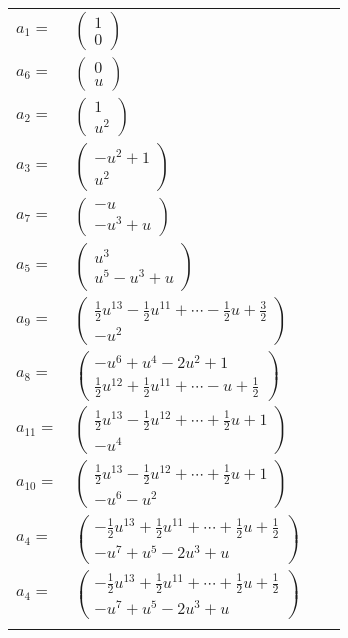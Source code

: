 \documentclass[1p]{elsarticle_modified}
\theoremstyle{definition}
\begin{document}
\begin{tabular}{m{7pt} m{180pt} m{7pt} m{180pt} }
\flushright $a_{1}=$&$\begin{pmatrix}1\\0\end{pmatrix}$ \\
\flushright $a_{6}=$&$\begin{pmatrix}0\\u\end{pmatrix}$ \\
\flushright $a_{2}=$&$\begin{pmatrix}1\\u^2\end{pmatrix}$ \\
\flushright $a_{3}=$&$\begin{pmatrix}- u^2+1\\u^2\end{pmatrix}$ \\
\flushright $a_{7}=$&$\begin{pmatrix}- u\\- u^3+u\end{pmatrix}$ \\
\flushright $a_{5}=$&$\begin{pmatrix}u^3\\u^5- u^3+u\end{pmatrix}$ \\
\flushright $a_{9}=$&$\begin{pmatrix}\frac{1}{2} u^{13}-\frac{1}{2} u^{11}+\cdots-\frac{1}{2} u+\frac{3}{2}\\- u^2\end{pmatrix}$ \\
\flushright $a_{8}=$&$\begin{pmatrix}- u^6+u^4-2 u^2+1\\\frac{1}{2} u^{12}+\frac{1}{2} u^{11}+\cdots- u+\frac{1}{2}\end{pmatrix}$ \\
\flushright $a_{11}=$&$\begin{pmatrix}\frac{1}{2} u^{13}-\frac{1}{2} u^{12}+\cdots+\frac{1}{2} u+1\\- u^4\end{pmatrix}$ \\
\flushright $a_{10}=$&$\begin{pmatrix}\frac{1}{2} u^{13}-\frac{1}{2} u^{12}+\cdots+\frac{1}{2} u+1\\- u^6- u^2\end{pmatrix}$ \\
\flushright $a_{4}=$&$\begin{pmatrix}-\frac{1}{2} u^{13}+\frac{1}{2} u^{11}+\cdots+\frac{1}{2} u+\frac{1}{2}\\- u^7+u^5-2 u^3+u\end{pmatrix}$\\ \flushright $a_{4}=$&$\begin{pmatrix}-\frac{1}{2} u^{13}+\frac{1}{2} u^{11}+\cdots+\frac{1}{2} u+\frac{1}{2}\\- u^7+u^5-2 u^3+u\end{pmatrix}$\\&\end{tabular}
\end{document}
